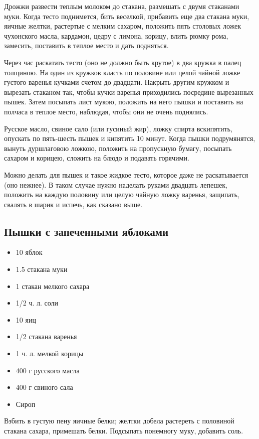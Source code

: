 Дрожжи развести теплым молоком до стакана, размешать с двумя стаканами муки. Когда тесто поднимется, бить веселкой, прибавить еще два стакана муки, яичные желтки, растертые с мелким сахаром, положить пять столовых ложек чухонского масла, кардамон, цедру с лимона, корицу, влить рюмку рома, замесить, поставить в теплое место и дать подняться.

Через час раскатать тесто (оно не должно быть крутое) в два кружка в палец толщиною. На один из кружков класть по половине или целой чайной ложке густого варенья кучками счетом до двадцати. Накрыть другим кружком и вырезать стаканом так, чтобы кучки варенья приходились посредине вырезанных пышек. Затем посыпать лист мукою, положить на него пышки и поставить на полчаса в теплое место, наблюдая, чтобы они не очень поднялись.

Русское масло, свиное сало (или гусиный жир), ложку спирта вскипятить, опускать по пять-шесть пышек и кипятить 10 минут. Когда пышки подрумянятся, вынуть дуршлаговою ложкою, положить на пропускную бумагу, посыпать сахаром и корицею, сложить на блюдо и подавать горячими.

Можно делать для пышек и такое жидкое тесто, которое даже не раскатывается (оно нежнее). В таком случае нужно наделать руками двадцать лепешек, положить на каждую половину или целую чайную ложку варенья, защипать, свалять в шарик и испечь, как сказано выше.

\subsection{Пышки с запеченными яблоками}

\begin{itemize}
	\item 10 яблок 
    \item 1.5 стакана муки
    \item 1 стакан мелкого сахара
    \item 1/2 ч. л. соли 
    \item 10 яиц
    \item 1/2 стакана варенья 
    \item 1 ч. л. мелкой корицы
    \item 400 г русского масла 
    \item 400 г свиного сала
    \item Сироп
\end{itemize}

Взбить в густую пену яичные белки; желтки добела растереть с половиной стакана сахара, примешать белки. Подсыпать понемногу муку, добавить соль.

